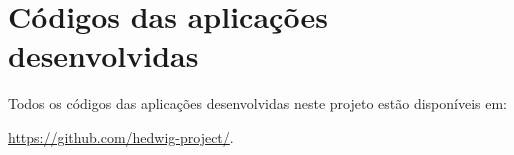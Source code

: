 \chapter{Códigos das aplicações desenvolvidas}
\label{github}
Todos os códigos das aplicações desenvolvidas neste projeto estão disponíveis em:
\par 
\url{https://github.com/hedwig-project/}.
